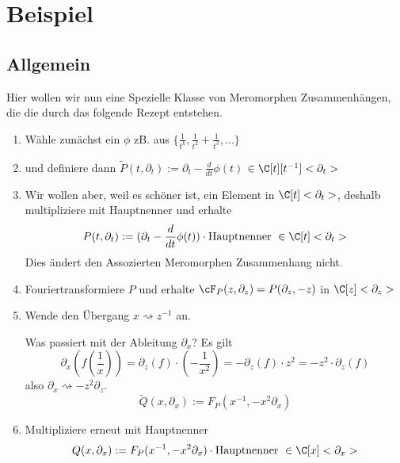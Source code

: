\chapter{Beispiel}

\section{Allgemein} \label{sec:allgemeinProblem}

\begin{comment}
siehe: \cite[5.b]{sabbah_Fourier-local}
\end{comment}

\begin{comment}
sei $\phi\in\{\frac{1}{t^k},\frac{1}{t^2}+\frac{1}{t^3},\dots\}$
\begin{enumerate}
\item Starte mit: $P(t,\partial_t):=(\partial_t-\frac{d}{dt}\phi(t)) \cdot
\mbox{Hauptnenner }\in\C[t]<\partial_t>$
\item Furiertrafo: $F_P(z,\partial_z)=P(\partial_z,-z)\in\C[z]<\partial_z>$
\item $x=z^{-1}$ und $\partial_x=-z^2\partial_z$ \\
\[
Q(x,\partial_x):=F_P(x^{-1},-x^2\partial_x)\cdot \mbox{Hauptnenner
}\in\C[x]<\partial_x>
\]
\item Berechne für $Q$ das NP usw...
\end{enumerate}
\end{comment}

Hier wollen wir nun eine Spezielle Klasse von Meromorphen Zusammenhängen, die
die durch das folgende Rezept entstehen.
\begin{enumerate}
\item Wähle zunächst ein $\phi$ zB. aus
$\{\frac{1}{t^k},\frac{1}{t^2}+\frac{1}{t^3},\dots\}$
\item und definiere dann 
$ \tilde P(t,\partial_t):=\partial_t-\frac{d}{dt}\phi(t)$
$\in\C[t][t^{-1}]<\partial_t>$
\item Wir wollen aber, weil es schöner ist, ein Element in $\C[t]<\partial_t>$,
deshalb multipliziere mit Hauptnenner und erhalte
\[
P(t,\partial_t):=(\partial_t-\frac{d}{dt}\phi(t)) \cdot
\mbox{Hauptnenner }\in\C[t]<\partial_t>
\]
Dies ändert den Assozierten Meromorphen Zusammenhang nicht.
\item Fouriertransformiere $P$ und erhalte 
$\cF_P(z,\partial_z)=P(\partial_z,-z)$ in $\C[z]<\partial_z>$
\item Wende den Übergang $x\rightsquigarrow z^{-1}$ an.

Was passiert mit der Ableitung $\partial_x$? Es gilt
\[
\partial_x (f(\frac{1}{x}))=
\partial_z(f)\cdot (-\frac{1}{x^2})=
-\partial_z(f)\cdot z^2= %
- z^2 \cdot \partial_z(f)
\]
also $ \partial_x\rightsquigarrow-z^2\partial_z $.
\[
\tilde Q(x,\partial_x):=F_P(x^{-1},-x^2\partial_x)
\]
\item Multipliziere erneut mit Hauptnenner
\[
Q(x,\partial_x):=F_P(x^{-1},-x^2\partial_x)\cdot \mbox{Hauptnenner
}\in\C[x]<\partial_x>
\]
\end{enumerate}

